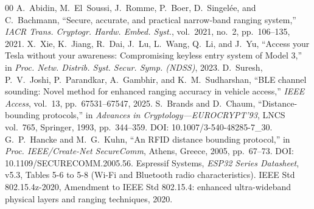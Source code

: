 \documentclass{ieeeaccess}
\begin{document}
\begin{thebibliography}{00}
 A.~Abidin, M.~El~Soussi, J.~Romme, P.~Boer, D.~Singel\'ee, and C.~Bachmann, ``Secure, accurate, and practical narrow-band ranging system,'' \emph{IACR Trans. Cryptogr. Hardw. Embed. Syst.}, vol.~2021, no.~2, pp.~106--135, 2021.
 X.~Xie, K.~Jiang, R.~Dai, J.~Lu, L.~Wang, Q.~Li, and J.~Yu, ``Access your Tesla without your awareness: Compromising keyless entry system of Model 3,'' in \emph{Proc. Netw. Distrib. Syst. Secur. Symp. (NDSS)}, 2023.
 D.~Suresh, P.~V.~Joshi, P.~Parandkar, A.~Gambhir, and K.~M.~Sudharshan, ``BLE channel sounding: Novel method for enhanced ranging accuracy in vehicle access,'' \emph{IEEE Access}, vol.~13, pp.~67531--67547, 2025.
 S.~Brands and D.~Chaum, ``Distance-bounding protocols,'' in \emph{Advances in Cryptology---EUROCRYPT'93}, LNCS vol.~765, Springer, 1993, pp.~344--359. DOI: 10.1007/3-540-48285-7\_30.
 G.~P.~Hancke and M.~G.~Kuhn, ``An RFID distance bounding protocol,'' in \emph{Proc. IEEE/Create-Net SecureComm}, Athens, Greece, 2005, pp.~67--73. DOI: 10.1109/SECURECOMM.2005.56.
 Espressif Systems, \emph{ESP32 Series Datasheet}, v5.3, Tables 5-6 to 5-8 (Wi-Fi and Bluetooth radio characteristics).
 IEEE Std 802.15.4z-2020, Amendment to IEEE Std 802.15.4: enhanced ultra-wideband physical layers and ranging techniques, 2020.
\end{thebibliography}

\EOD
\end{document}
